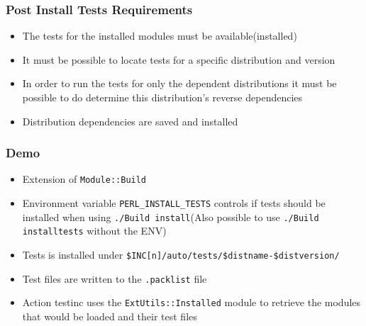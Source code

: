 \documentclass[10pt]{beamer}
\begin{document}
\begin{frame}
\frametitle{Post Install Tests Requirements}
\begin{itemize}
\item The tests for the installed modules must be available(installed)
\item It must be possible to locate tests for a specific distribution and version
\item In order to run the tests for only the dependent distributions it must be possible to do determine this distribution's reverse dependencies
\item Distribution dependencies are saved and installed
\end{itemize}
\end{frame}

\begin{frame}[fragile]
\frametitle{Demo}

\begin{itemize}
\item Extension of \verb|Module::Build|
\item Environment variable \verb|PERL_INSTALL_TESTS| controls if tests should be installed when using  \verb|./Build install|(Also possible to use \verb|./Build installtests| without the ENV)
\item Tests is installed under \verb|$INC[n]/auto/tests/$distname-$distversion/|
\item Test files are written to the \verb|.packlist| file
\item Action testinc uses the \verb|ExtUtils::Installed| module to retrieve the modules that would be loaded and their test files
\end{itemize}
\end{frame}
\end{document}
